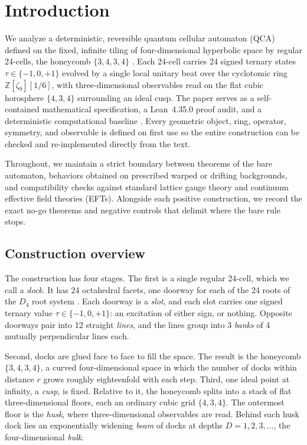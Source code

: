 \section*{Introduction}

We analyze a deterministic, reversible quantum cellular automaton (QCA) defined on the fixed, infinite tiling of
four-dimensional hyperbolic space by regular 24-cells, the honeycomb $\{3,4,3,4\}$
\cite{coxeter1956, coxeter1973, margenstern2007vol1}. Each 24-cell carries 24 signed ternary states
$\tau \in \{-1, 0, +1\}$ evolved by a single local unitary beat over the cyclotomic ring $\mathbb{Z}[\zeta_9][1/6]$,
with three-dimensional observables read on the flat cubic horosphere $\{4,3,4\}$ surrounding an ideal cusp. The paper
serves as a self-contained mathematical specification, a Lean~4.35.0 proof audit, and a deterministic computational
baseline \cite{cluesurf2026repo}. Every geometric object, ring, operator, symmetry, and observable is defined on first
use so the entire construction can be checked and re-implemented directly from the text.

Throughout, we maintain a strict boundary between theorems of the bare automaton, behaviors obtained on prescribed
warped or drifting backgrounds, and compatibility checks against standard lattice gauge theory and continuum effective
field theories (EFTs). Alongside each positive construction, we record the exact no-go theorems and negative controls
that delimit where the bare rule stops.

\subsection*{Construction overview}

The construction has four stages. The first is a single regular 24-cell, which we call a \emph{dock}. It has 24 octahedral facets, one doorway for each of the 24 roots of the $D_4$ root system
\cite{conway1999}. Each doorway is a \emph{slot}, and each slot carries one signed ternary value
$\tau \in \{-1, 0, +1\}$: an excitation of either sign, or nothing. Opposite doorways pair into 12 straight
\emph{lines}, and the lines group into 3 \emph{banks} of 4 mutually perpendicular lines each.

Second, docks are glued face to face to fill the space. The result is the honeycomb $\{3,4,3,4\}$, a curved
four-dimensional space in which the number of docks within distance $r$ grows roughly eighteenfold with each step.
Third, one ideal point at infinity, a \emph{cusp}, is fixed. Relative to it, the honeycomb splits into a stack of flat
three-dimensional floors, each an
ordinary cubic grid $\{4,3,4\}$. The outermost floor is the \emph{husk}, where three-dimensional observables are read.
Behind each husk dock lies an exponentially widening \emph{beam} of docks at depths $D = 1, 2, 3, \ldots$, the
four-dimensional \emph{bulk}.

